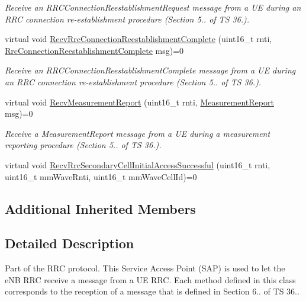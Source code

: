 \begin{DoxyCompactItemize}
\begin{DoxyCompactList}\small\item\em Receive an {\itshape R\+R\+C\+Connection\+Reestablishment\+Request} message from a UE during an R\+RC connection re-\/establishment procedure (Section 5.. of TS 36.). \end{DoxyCompactList}\item 
virtual void \hyperlink{classns3_1_1LteEnbRrcSapProvider_a45f6b371cbc613840cdc2c950768201f}{Recv\+Rrc\+Connection\+Reestablishment\+Complete} (uint16\+\_\+t rnti, \hyperlink{structns3_1_1LteRrcSap_1_1RrcConnectionReestablishmentComplete}{Rrc\+Connection\+Reestablishment\+Complete} msg)=0
\begin{DoxyCompactList}\small\item\em Receive an {\itshape R\+R\+C\+Connection\+Reestablishment\+Complete} message from a UE during an R\+RC connection re-\/establishment procedure (Section 5.. of TS 36.). \end{DoxyCompactList}\item 
virtual void \hyperlink{classns3_1_1LteEnbRrcSapProvider_abf788b7395d6a2bc7e0ab86a3f992695}{Recv\+Measurement\+Report} (uint16\+\_\+t rnti, \hyperlink{structns3_1_1LteRrcSap_1_1MeasurementReport}{Measurement\+Report} msg)=0
\begin{DoxyCompactList}\small\item\em Receive a {\itshape Measurement\+Report} message from a UE during a measurement reporting procedure (Section 5.. of TS 36.). \end{DoxyCompactList}\item 
virtual void \hyperlink{classns3_1_1LteEnbRrcSapProvider_a25726b9a504fc742fc984d381891f9fb}{Recv\+Rrc\+Secondary\+Cell\+Initial\+Access\+Successful} (uint16\+\_\+t rnti, uint16\+\_\+t mm\+Wave\+Rnti, uint16\+\_\+t mm\+Wave\+Cell\+Id)=0
\end{DoxyCompactItemize}
\subsection*{Additional Inherited Members}


\subsection{Detailed Description}
Part of the R\+RC protocol. This Service Access Point (S\+AP) is used to let the e\+NB R\+RC receive a message from a UE R\+RC. Each method defined in this class corresponds to the reception of a message that is defined in Section 6.. of TS 36.. 

